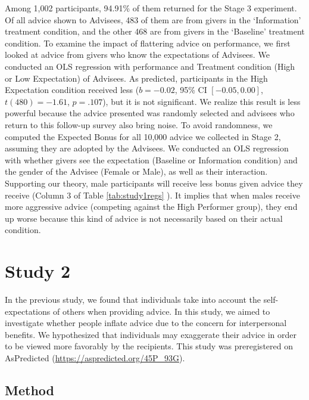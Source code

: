 \documentclass[
  man,floatsintext]{apa6}
\begin{document}
Among 1,002 participants, 94.91\% of them returned for the Stage 3 experiment. Of all advice shown to Advisees, 483 of them are from givers in the `Information' treatment condition, and the other 468 are from givers in the `Baseline' treatment condition. To examine the impact of flattering advice on performance, we first looked at advice from givers who know the expectations of Advisees. We conducted an OLS regression with performance and Treatment condition (High or Low Expectation) of Advisees. As predicted, participants in the High Expectation condition received less (\(b = -0.02\), 95\% CI \([-0.05, 0.00]\), \(t(480) = -1.61\), \(p = .107\)), but it is not significant. We realize this result is less powerful because the advice presented was randomly selected and advisees who return to this follow-up survey also bring noise.
To avoid randomness, we computed the Expected Bonus for all 10,000 advice we collected in Stage 2, assuming they are adopted by the Advisees. We conducted an OLS regression with whether givers see the expectation (Baseline or Information condition) and the gender of the Advisee (Female or Male), as well as their interaction. Supporting our theory, male participants will receive less bonus given advice they receive (Column 3 of Table \ref{tab:study1regs} ). It implies that when males receive more aggressive advice (competing against the High Performer group), they end up worse because this kind of advice is not necessarily based on their actual condition.

\hypertarget{study-2}{%
\section{Study 2}\label{study-2}}

In the previous study, we found that individuals take into account the self-expectations of others when providing advice. In this study, we aimed to investigate whether people inflate advice due to the concern for interpersonal benefits. We hypothesized that individuals may exaggerate their advice in order to be viewed more favorably by the recipients. This study was preregistered on AsPredicted (\url{https://aspredicted.org/45P_93G}).

\hypertarget{method}{%
\subsection{Method}\label{method}}
\end{document}

